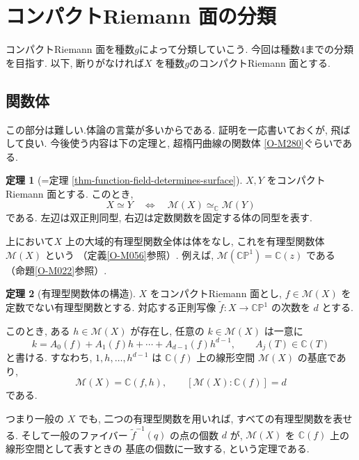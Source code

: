 \documentclass[dvipdfmx,a4paper,11pt]{article} %
\newcommand{\C}{\mathbb{C}}
\theoremstyle{definition}
\newtheorem{thm}{定理}[section]
\numberwithin{equation}{section}
\begin{document}
\newpage
\section{コンパクトRiemann 面の分類}
コンパクトRiemann 面を種数$g$によって分類していこう. 今回は種数$4$までの分類を目指す. 
以下, 断りがなければ$X$ を種数$g$のコンパクトRiemann 面とする.

\subsection{関数体}
この部分は難しい.体論の言葉が多いからである. 証明を一応書いておくが, 飛ばして良い. 
今後使う内容は下の定理と, 超楕円曲線の関数体 \ref{O-M280}ぐらいである. 
\begin{thm}[{=定理 \ref{thm-function-field-determines-surface}}]
$X,Y$ をコンパクトRiemann 面とする.
このとき, 
\[
X\simeq Y
\quad\Longleftrightarrow\quad
\mathcal M(X)\simeq_{\mathbb C}\mathcal M(Y)
\]
である.
左辺は双正則同型, 右辺は定数関数を固定する体の同型を表す.
\end{thm}
上において$X$ 上の大域的有理型関数全体は体をなし,
これを有理型関数体 $\mathcal M(X)$ という
（定義\ref{O-M056}参照）.
例えば, $\mathcal M(\C\mathbb P^1)=\C(z)$ である
（命題\ref{O-M022}参照）.



\begin{thm}[有理型関数体の構造]\label{O-M274}
$X$ をコンパクトRiemann 面とし,
$f\in\mathcal M(X)$ を定数でない有理型関数とする.
対応する正則写像
$\widetilde f:X\to\C\mathbb P^1$ の次数を $d$ とする.

このとき, ある $h\in\mathcal M(X)$ が存在し,
任意の $k\in\mathcal M(X)$ は一意に
\[
k=A_0(f)+A_1(f)h+\cdots+A_{d-1}(f)h^{d-1},
\qquad A_j(T)\in\C(T)
\]
と書ける.
すなわち, $1,h,\ldots,h^{d-1}$ は
$\C(f)$ 上の線形空間 $\mathcal M(X)$ の基底であり,
\[
\mathcal M(X)=\C(f,h),\qquad
[\mathcal M(X):\C(f)]=d
\]
である.
\end{thm}
つまり一般の $X$ でも, 二つの有理型関数を用いれば,
すべての有理型関数を表せる.
そして一般のファイバー $\widetilde f^{-1}(q)$ の点の個数 $d$ が,
$\mathcal M(X)$ を $\C(f)$ 上の線形空間として表すときの
基底の個数に一致する, という定理である.
\end{document}
